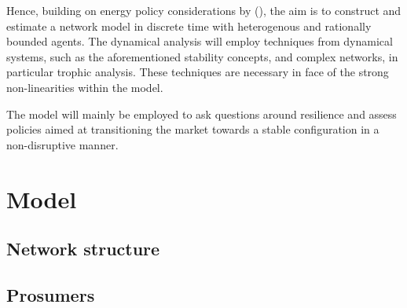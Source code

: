 \documentclass[american]{scrartcl}
\begin{document}
Hence, building on energy policy considerations by \citeauthor{Parag2016} (\citeyear{Parag2016}), the aim is to construct and estimate a network model in discrete time with heterogenous and rationally bounded agents. The dynamical analysis will employ techniques from dynamical systems, such as the aforementioned stability concepts, and complex networks, in particular trophic analysis. These techniques are necessary in face of the strong non-linearities within the model.

The model will mainly be employed to ask questions around resilience and assess policies aimed at transitioning the market towards a stable configuration in a non-disruptive manner.

\newpage
{} %
\printbibliography

\newpage
\appendix

\section{Model}

\subsection{Network structure}

\begin{center}
\end{center}

\subsection{Prosumers}
\end{document}
